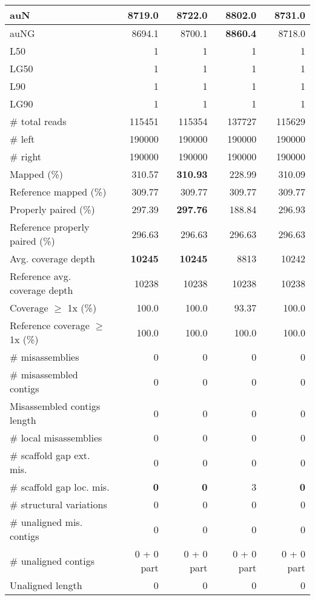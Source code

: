 \documentclass[12pt,a4paper]{article}
\begin{document}
\begin{table}[ht]
\begin{center}
\begin{tabular}{|l*{4}{|r}|}
auN & 8719.0 & 8722.0 & {\bf 8802.0} & 8731.0 \\ \hline
auNG & 8694.1 & 8700.1 & {\bf 8860.4} & 8718.0 \\ \hline
L50 & 1 & 1 & 1 & 1 \\ \hline
LG50 & 1 & 1 & 1 & 1 \\ \hline
L90 & 1 & 1 & 1 & 1 \\ \hline
LG90 & 1 & 1 & 1 & 1 \\ \hline
\# total reads & 115451 & 115354 & 137727 & 115629 \\ \hline
\# left & 190000 & 190000 & 190000 & 190000 \\ \hline
\# right & 190000 & 190000 & 190000 & 190000 \\ \hline
Mapped (\%) & 310.57 & {\bf 310.93} & 228.99 & 310.09 \\ \hline
Reference mapped (\%) & 309.77 & 309.77 & 309.77 & 309.77 \\ \hline
Properly paired (\%) & 297.39 & {\bf 297.76} & 188.84 & 296.93 \\ \hline
Reference properly paired (\%) & 296.63 & 296.63 & 296.63 & 296.63 \\ \hline
Avg. coverage depth & {\bf 10245} & {\bf 10245} & 8813 & 10242 \\ \hline
Reference avg. coverage depth & 10238 & 10238 & 10238 & 10238 \\ \hline
Coverage $\geq$ 1x (\%) & 100.0 & 100.0 & 93.37 & 100.0 \\ \hline
Reference coverage $\geq$ 1x (\%) & 100.0 & 100.0 & 100.0 & 100.0 \\ \hline
\# misassemblies & 0 & 0 & 0 & 0 \\ \hline
\# misassembled contigs & 0 & 0 & 0 & 0 \\ \hline
Misassembled contigs length & 0 & 0 & 0 & 0 \\ \hline
\# local misassemblies & 0 & 0 & 0 & 0 \\ \hline
\# scaffold gap ext. mis. & 0 & 0 & 0 & 0 \\ \hline
\# scaffold gap loc. mis. & {\bf 0} & {\bf 0} & 3 & {\bf 0} \\ \hline
\# structural variations & 0 & 0 & 0 & 0 \\ \hline
\# unaligned mis. contigs & 0 & 0 & 0 & 0 \\ \hline
\# unaligned contigs & 0 + 0 part & 0 + 0 part & 0 + 0 part & 0 + 0 part \\ \hline
Unaligned length & 0 & 0 & 0 & 0 \\ \hline

\end{tabular}
\end{center}
\end{table}
\end{document}
